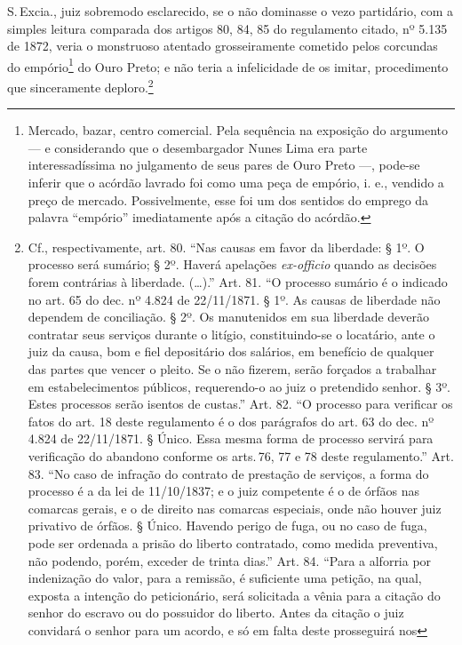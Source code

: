 {S.\,Excia., juiz sobremodo esclarecido, se o não dominasse o vezo
partidário, com a simples leitura comparada dos artigos 80, 84, 85 do
regulamento citado, nº 5.135 de 1872, veria o monstruoso atentado
grosseiramente cometido pelos corcundas do empório\footnote{Mercado,
  bazar, centro comercial. Pela sequência na exposição do argumento --- e
  considerando que o desembargador Nunes Lima era parte interessadíssima no
  julgamento de seus pares de Ouro Preto ---, pode-se inferir que o
  acórdão lavrado foi como uma peça de empório, i. e., vendido a preço
  de mercado. Possivelmente, esse foi um dos sentidos do emprego da
  palavra ``empório'' imediatamente após a citação do acórdão.} do Ouro
Preto; e não teria a infelicidade de os imitar, procedimento que
sinceramente deploro.\footnote{Cf., respectivamente, art. 80. ``Nas
  causas em favor da liberdade: § 1º. O processo será sumário; § 2º.
  Haverá apelações \emph{ex-officio} quando as decisões forem contrárias
  à liberdade. (\ldots{}).'' Art. 81. ``O processo sumário é o indicado no art.
  65 do dec. nº 4.824 de 22/11/1871. § 1º. As causas de liberdade não
  dependem de conciliação. § 2º. Os manutenidos em sua liberdade deverão
  contratar seus serviços durante o litígio, constituindo-se o
  locatário, ante o juiz da causa, bom e fiel depositário dos salários,
  em benefício de qualquer das partes que vencer o pleito. Se o não
  fizerem, serão forçados a trabalhar em estabelecimentos públicos,
  requerendo-o ao juiz o pretendido senhor. § 3º. Estes processos serão
  isentos de custas.'' Art. 82. ``O processo para verificar os fatos do art.
  18 deste regulamento é o dos parágrafos do art. 63 do dec. nº 4.824 de
  22/11/1871. § Único. Essa mesma forma de processo servirá para
  verificação do abandono conforme os arts.\,76, 77 e 78 deste
  regulamento.'' Art. 83. ``No caso de infração do contrato de prestação de
  serviços, a forma do processo é a da lei de 11/10/1837; e o juiz
  competente é o de órfãos nas comarcas gerais, e o de direito nas
  comarcas especiais, onde não houver juiz privativo de órfãos. § Único.
  Havendo perigo de fuga, ou no caso de fuga, pode ser ordenada a prisão
  do liberto contratado, como medida preventiva, não podendo, porém,
  exceder de trinta dias.'' Art. 84. ``Para a alforria por indenização do
  valor, para a remissão, é suficiente uma petição, na qual, exposta a
  intenção do peticionário, será solicitada a vênia para a citação do
  senhor do escravo ou do possuidor do liberto. Antes da citação o juiz
  convidará o senhor para um acordo, e só em falta deste prosseguirá nos
}}
